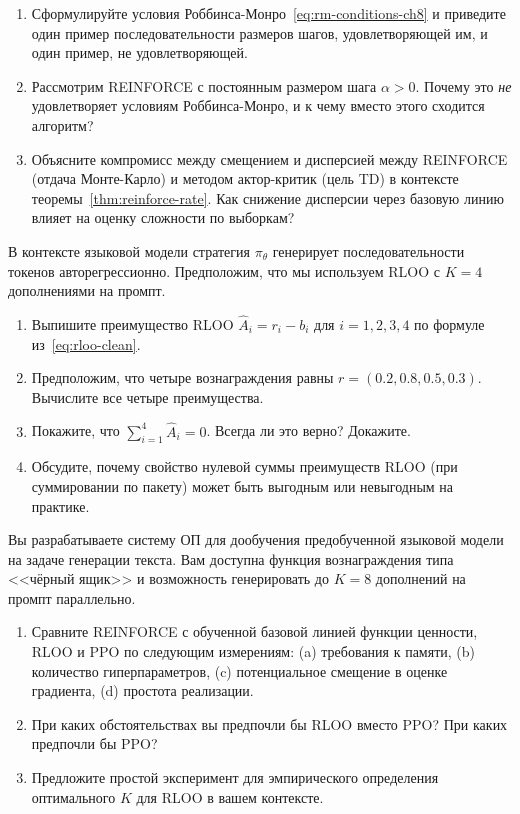 \begin{exercise}
\label{ex:pg-convergence}
\begin{enumerate}
\item Сформулируйте условия Роббинса-Монро~\eqref{eq:rm-conditions-ch8} и приведите один пример последовательности размеров шагов, удовлетворяющей им, и один пример, не удовлетворяющей.
\item Рассмотрим REINFORCE с постоянным размером шага $\alpha > 0$. Почему это \emph{не} удовлетворяет условиям Роббинса-Монро, и к чему вместо этого сходится алгоритм?
\item Объясните компромисс между смещением и дисперсией между REINFORCE (отдача Монте-Карло) и методом актор-критик (цель TD) в контексте теоремы~\ref{thm:reinforce-rate}. Как снижение дисперсии через базовую линию влияет на оценку сложности по выборкам?
\end{enumerate}
\end{exercise}

\begin{exercise}
\label{ex:pg-lm}
В контексте языковой модели стратегия $\pi_\theta$ генерирует последовательности токенов авторегрессионно. Предположим, что мы используем RLOO с $K = 4$ дополнениями на промпт.
\begin{enumerate}
\item Выпишите преимущество RLOO $\hat A_i = r_i - b_i$ для $i = 1, 2, 3, 4$ по формуле из~\eqref{eq:rloo-clean}.
\item Предположим, что четыре вознаграждения равны $r = (0.2, 0.8, 0.5, 0.3)$. Вычислите все четыре преимущества.
\item Покажите, что $\sum_{i=1}^4 \hat A_i = 0$. Всегда ли это верно? Докажите.
\item Обсудите, почему свойство нулевой суммы преимуществ RLOO (при суммировании по пакету) может быть выгодным или невыгодным на практике.
\end{enumerate}
\end{exercise}

\begin{exercise}
\label{ex:pg-comparison-design}
Вы разрабатываете систему ОП для дообучения предобученной языковой модели на задаче генерации текста. Вам доступна функция вознаграждения типа <<чёрный ящик>> и возможность генерировать до $K = 8$ дополнений на промпт параллельно.
\begin{enumerate}
\item Сравните REINFORCE с обученной базовой линией функции ценности, RLOO и PPO по следующим измерениям: (a) требования к памяти, (b) количество гиперпараметров, (c) потенциальное смещение в оценке градиента, (d) простота реализации.
\item При каких обстоятельствах вы предпочли бы RLOO вместо PPO? При каких предпочли бы PPO?
\item Предложите простой эксперимент для эмпирического определения оптимального $K$ для RLOO в вашем контексте.
\end{enumerate}
\end{exercise}
